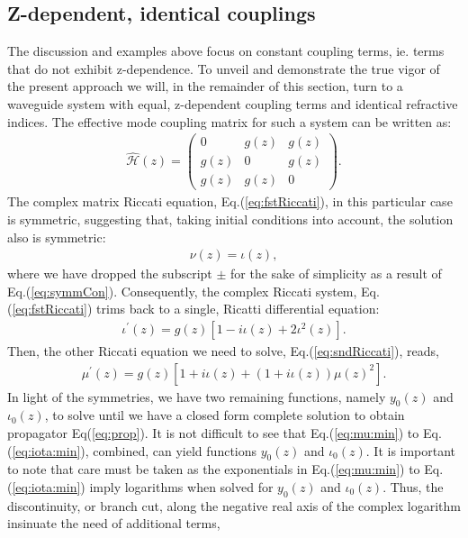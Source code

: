 \documentclass[9pt,twocolumn,twoside]{osajnl}
\begin{document}
\subsection{Z-dependent, identical couplings}
The discussion and examples above focus on constant coupling terms, ie. terms that do not exhibit z-dependence.
To unveil and demonstrate the true vigor of the present approach we will, in the remainder of this section, turn to a waveguide system with equal, z-dependent coupling terms and identical refractive indices.
The effective mode coupling matrix for such a system can be written as:
\begin{eqnarray}\label{eq:modCppl:zDep}
\hat{\mathcal{H}}(z) =
 \left( \begin{array}{ccc} 
	0  & g(z) & g(z) \\
	g(z) & 0 & g(z) \\
	g(z) & g(z) & 0
\end{array} \right).
\end{eqnarray}
The complex matrix Riccati equation, Eq.(\ref{eq:fstRiccati}), in this particular case is symmetric, suggesting that, taking initial conditions into account, the solution also is symmetric:
\begin{eqnarray}\label{eq:symm:nuiota}	
	\nu(z)=\iota(z), 
\end{eqnarray}
where we have dropped the subscript $\pm$ for the sake of simplicity as a result of  Eq.(\ref{eq:symmCon}). 
Consequently, the complex Riccati system, Eq.(\ref{eq:fstRiccati}) trims back to a single, Ricatti differential equation:
\begin{eqnarray}\label{eq:redRiccati}
	\iota^{\prime}(z) = g(z)[1 - i\iota(z) +2 \iota^2(z)].
\end{eqnarray}
Then, the other Riccati equation we need to solve, Eq.(\ref{eq:sndRiccati}), reads,
\begin{eqnarray}\label{eq:sndRiccati:zDep}
	\mu^{\prime}(z) = 
	g(z) [1+i\iota(z) + (1+i\iota(z))\mu(z)^2].
\end{eqnarray}
In light of the symmetries, we have two remaining functions, namely $y_0(z)$ and $\iota_0(z)$, 
to solve until we have a closed form complete solution to obtain propagator Eq(\ref{eq:prop}). 
It is not difficult to see that Eq.(\ref{eq:mu:min})
to Eq.(\ref{eq:iota:min}), combined, can yield 
functions $y_0(z)$ and $\iota_0(z)$. 
It is important to note that care must be taken as the exponentials in Eq.(\ref{eq:mu:min}) to Eq.(\ref{eq:iota:min}) imply logarithms when solved for $y_0(z)$ and $\iota_0(z)$. 
Thus, the  discontinuity, or branch cut, along the negative real axis of the complex logarithm insinuate the need of additional terms, 
\end{document}

